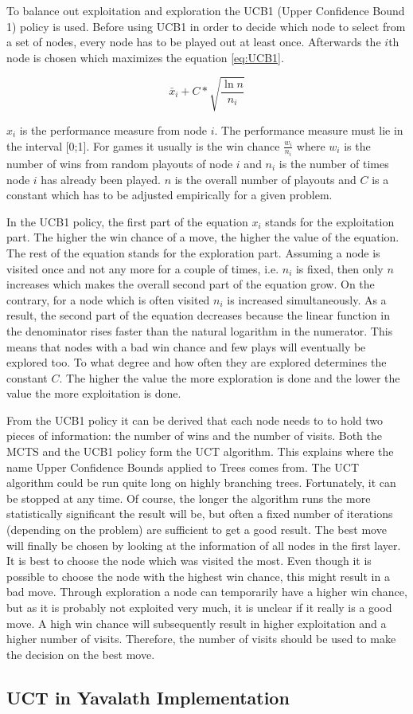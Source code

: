 \documentclass[german]{report}
\begin{document}
To balance out exploitation and exploration the UCB1 (Upper Confidence Bound 1)
policy is used. %
Before using UCB1 in order to decide which node to select from a set of nodes,
every node has to be played out at least once. Afterwards the \(i\)th node is
chosen which maximizes the equation \ref{eq:UCB1}.

\begin{equation}
\label{eq:UCB1}
\bar{x}_{i} + C * \sqrt{\frac{\ln n}{n_{i}}}
\end{equation}

\(x_{i}\) is the performance measure from node \(i\). The performance measure
must lie in the interval [0;1]. For games it usually is the win chance
\(\frac{w_{i}}{n_{i}}\) where \(w_{i}\) is the number of wins from random
playouts of node \(i\) and \(n_{i}\) is the number of times node \(i\) has
already been played. \(n\) is the overall number of playouts and \(C\) is a
constant which has to be adjusted empirically for a given problem. %

In the UCB1 policy, the first part of the equation \(x_{i}\) stands for the
exploitation part. The higher the win chance of a move, the higher the value of
the equation. The rest of the equation stands for the exploration part. Assuming
a node is visited once and not any more for a couple of times, i.e. \(n_{i}\) is
fixed, then only \(n\) increases which makes the overall second part of the
equation grow. On the contrary, for a node which is often visited \(n_{i}\) is
increased simultaneously. As a result, the second part of the equation decreases
because the linear function in the denominator rises faster than the natural
logarithm in the numerator. This means that nodes with a bad win chance and few
plays will eventually be explored too. To what degree and how often they are
explored determines the constant \(C\). The higher the value the more
exploration is done and the lower the value the more exploitation is done.

From the UCB1 policy it can be derived that each node needs to to hold two
pieces of information: the number of wins and the number of visits.
Both the MCTS and the UCB1 policy form the UCT algorithm. This explains where
the name Upper Confidence Bounds applied to Trees comes from. The UCT algorithm
could be run quite long on highly branching trees. Fortunately, it can be
stopped at any time. Of course, the longer the algorithm runs the more
statistically significant the result will be, but often a fixed number of
iterations (depending on the problem) are sufficient to get a good result.
The best move will finally be chosen by looking at the information of all nodes
in the first layer. It is best to choose the node which was visited the most.
Even though it is possible to choose the node with the highest win chance, this
might result in a bad move. Through exploration a node can temporarily have a
higher win chance, but as it is probably not exploited very much, it is unclear
if it really is a good move. A high win chance will subsequently result in
higher exploitation and a higher number of visits. Therefore, the number of
visits should be used to make the decision on the best move.

\subsection{UCT in Yavalath Implementation}


\end{document}
